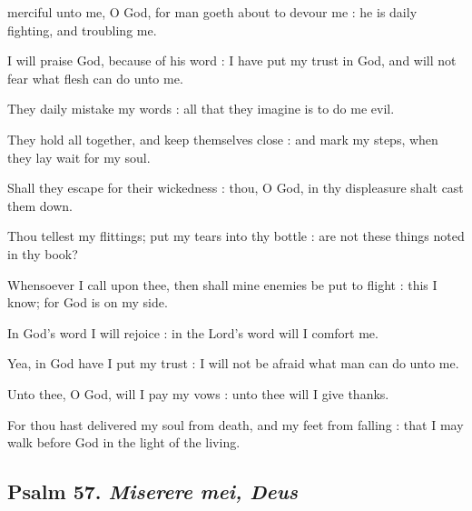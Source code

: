  merciful unto me, O God, for man goeth about to devour me : he is daily fighting, and troubling me.\par
{}
I will praise God, because of his word : I have put my trust in God, and will not fear what flesh can do unto me.\par
{}They daily mistake my words : all that they imagine is to do me evil.\par
{}They hold all together, and keep themselves close : and mark my steps, when they lay wait for my soul.\par
{}Shall they escape for their wickedness : thou, O God, in thy displeasure shalt cast them down.\par
{}Thou tellest my flittings; put my tears into thy bottle : are not these things noted in thy book?\par
{}Whensoever I call upon thee, then shall mine enemies be put to flight : this I know; for God is on my side.\par
{}In God's word I will rejoice : in the Lord's word will I comfort me.\par
{}Yea, in God have I put my trust : I will not be afraid what man can do unto me.\par
{}Unto thee, O God, will I pay my vows : unto thee will I give thanks.\par
{}For thou hast delivered my soul from death, and my feet from falling : that I may walk before God in the light of the living.\par

\subsection{Psalm 57. \textit{Miserere mei, Deus}}

